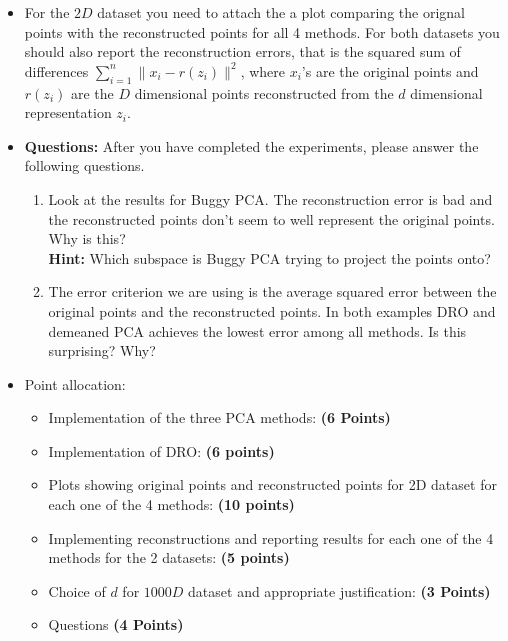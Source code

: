 \documentclass[a4paper]{article}
\theoremstyle{definition}
\begin{document}
\begin{itemize}
	\item
	      For the $2D$ dataset you need to attach the a
	      plot comparing the orignal points with the reconstructed points for all 4
	      methods.
	      For both datasets you should also report the reconstruction errors, that is the squared sum of
	      differences $\sum_{i=1}^n \|x_i - r(z_i)\|^2$,
	      where $x_i$'s are the original points and $r(z_i)$ are the $D$ dimensional points
	      reconstructed from the
	      $d$ dimensional representation $z_i$.

	\item \textbf{Questions:} After you have completed the experiments, please answer the following questions.
	      \begin{enumerate}
		      \item Look at the results for Buggy PCA. The reconstruction error is bad and the
		            reconstructed points don't seem to well represent the original points. Why is
		            this? \\
		            \textbf{Hint: } Which subspace is Buggy PCA trying to project the points
		            onto?
		      \item The error criterion we are using is the average squared error
		            between the original points and the reconstructed points.
		            In both examples DRO and demeaned PCA achieves the lowest error among all
		            methods.
		            Is this surprising? Why?
	      \end{enumerate}

	\item Point allocation:
	      \begin{itemize}
		      \item Implementation of the three PCA methods: \textbf{(6 Points)}
		      \item Implementation of DRO: \textbf{(6 points)}
		      \item Plots showing original points and reconstructed points for 2D dataset for each one of the 4 methods: \textbf{(10 points)}
		      \item Implementing reconstructions and reporting results for each one of the 4 methods for the 2 datasets: \textbf{(5 points)}
		      \item Choice of $d$ for $1000D$ dataset and appropriate justification:
		            \textbf{(3 Points)}
		      \item Questions \textbf{(4 Points)}
	      \end{itemize}

\end{itemize}
\end{document}
